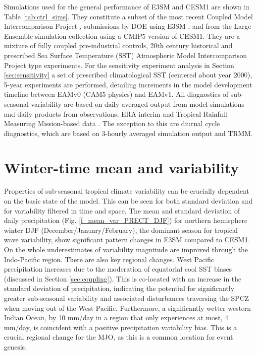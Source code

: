 \documentclass[draft,ms]{AGUTeX}
\begin{document}
\begin{article}
Simulations used for the general performance of E3SM and CESM1 are shown in Table \ref{tab:ctrl_sims}. They constitute a subset of the most recent Coupled Model Intercomparison Project \cite[CMIP6,][]{Eyring2016}, submissions by DOE using E3SM \citep{Golaz2019}, and from the Large Ensemble simulation collection \citep{CESM_LENS} using a CMIP5 \citep{CMIP5} version of CESM1. They are a mixture of fully coupled pre-industrial controls, 20th century historical and prescribed Sea Surface Temperature (SST) Atmospheric Model Intercomparison Project   \citep[AMIP,][]{Gates1992} type experiments. For the sensitivity experiment analysis in Section \ref{sec:sensitivity} a set of prescribed climatological SST (centered about year 2000), 5-year experiments are performed, detailing increments in the model development timeline between EAMv0 (CAM5 physics) and EAMv1. All diagnostics of sub-seasonal variability are based on daily averaged output from model simulations and daily products from observations; ERA interim \citep[ERAI,][]{ERA-I} and Tropical Rainfall Measuring Mission-based data \citep[TRMM,][]{Kummerow2000}  . The exception to this are diurnal cycle diagnostics, which are based on 3-hourly averaged simulation output and TRMM.

\section{Winter-time mean and variability}
\label{sec:mean_var}

Properties of sub-seasonal tropical climate variability can be crucially dependent on the basic state of the model. This can be seen for both standard deviation and for variability filtered in time and space. The mean and standard deviation of daily precipitation (Fig. \ref{f_mean_var_PRECT_DJF}) for northern hemisphere winter DJF (December/January/February), the dominant season for tropical wave variability, show significant pattern changes in E3SM compared to CESM1. On the whole underestimates of variability magnitude are improved through the Indo-Pacific region. There are also key regional changes. West Pacific precipitation increases due to the moderation of equatorial cool SST biases (discussed in Section \ref{sec:coupling}). This is co-located with an increase in the standard deviation of precipitation, indicating the potential for significantly greater sub-seasonal variability and associated disturbances traversing the SPCZ when moving out of the West Pacific. Furthermore, a significantly wetter western Indian Ocean, by 10 mm/day in a region that only experiences at most, 4 mm/day, is coincident with a positive precipitation variability bias. This is a crucial regional change for the MJO, as this is a common location for event genesis. 


\end{article}
\end{document}
